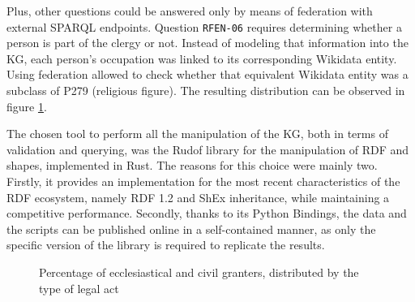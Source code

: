 \documentclass{article}
\begin{document}
Plus, other questions could be answered only by means of federation with external SPARQL endpoints.
Question \texttt{RFEN-06} requires determining whether a person is part of the clergy or not.
Instead of modeling that information into the KG, each person's occupation was linked to its corresponding Wikidata entity.
Using federation allowed to check whether that equivalent Wikidata entity was a subclass of P279 (religious figure). 
The resulting distribution can be observed in figure \ref{fig:granters}.

The chosen tool to perform all the manipulation of the KG, both in terms of validation and querying, was the Rudof library for the manipulation of RDF and shapes, implemented in Rust\cite{labra-gayo_rudof_nodate}.
The reasons for this choice were mainly two.
Firstly, it provides an implementation for the most recent characteristics of the RDF ecosystem, namely RDF 1.2 and ShEx inheritance, while maintaining a competitive performance.
Secondly, thanks to its Python Bindings, the data and the scripts can be published online in a self-contained manner, as only the specific version of the library is required to replicate the results.

\begin{figure}
\caption{Percentage of ecclesiastical and civil granters, distributed by the type of legal act}
\label{fig:granters}
\end{figure}
\end{document}
